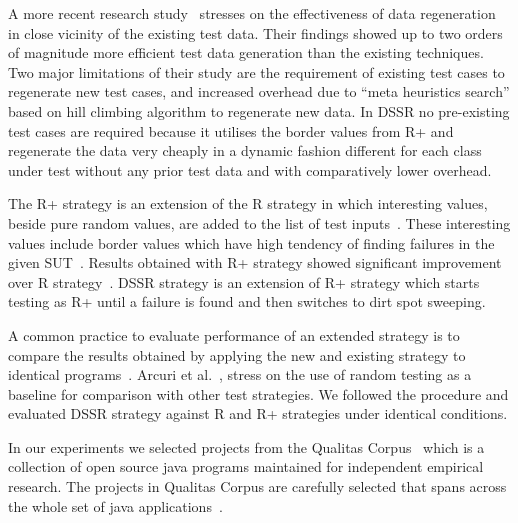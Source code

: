 A more recent research study~\cite{yoo2012test} stresses on the effectiveness of data regeneration in close vicinity of the existing test data. Their findings showed up to two orders of magnitude more efficient test data generation than the existing techniques. Two major limitations of their study are the requirement of existing test cases to regenerate new test cases, and increased overhead due to ``meta heuristics search'' based on hill climbing algorithm to regenerate new data. In DSSR no pre-existing test cases are required because it utilises the border values from R+ and regenerate the data very cheaply in a dynamic fashion different for each class under test without any prior test data and with comparatively lower overhead. 
  
The R+ strategy is an extension of the R strategy in which interesting values, beside pure random values, are added to the list of test inputs~\cite{leitner2007reconciling}. These interesting values include border values which have high tendency of finding failures in the given SUT~\cite{beizer2003software}. Results obtained with R+ strategy showed significant improvement over R strategy~\cite{leitner2007reconciling}. DSSR strategy is an extension of R+ strategy which starts testing as R+ until a failure is found and then switches to dirt spot sweeping.



A common practice to evaluate performance of an extended strategy is to compare the results obtained by applying the new and existing strategy to identical programs~\cite{hamlet1990partition, duran1984evaluation, gutjahr1999partition}. Arcuri et al.~\cite{arcuri2012random}, stress on the use of random testing as a baseline for comparison with other test strategies. We followed the procedure and evaluated DSSR strategy against R and R+ strategies under identical conditions.

In our experiments we selected projects from the Qualitas Corpus~\cite{tempero2010qualitas} which is a collection of open source java programs maintained for independent empirical research. The projects in Qualitas Corpus are carefully selected that spans across the whole set of java applications~\cite{oriol2012random, tempero2010empirical, tempero2008empirical}.


